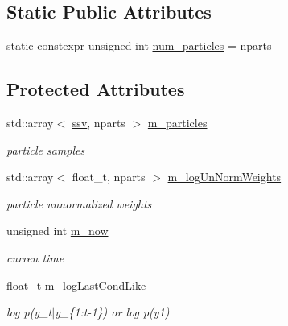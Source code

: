 \subsection*{Static Public Attributes}
\begin{DoxyCompactItemize}
\item 
static constexpr unsigned int \hyperlink{classAPF_a3cc77adc62c7de8ddbdee9240701dc78}{num\+\_\+particles} = nparts
\end{DoxyCompactItemize}
\subsection*{Protected Attributes}
\begin{DoxyCompactItemize}
\item 
\mbox{\label{classAPF_a620b00e90348a8c14efe7945a65b1580}} 
std\+::array$<$ \hyperlink{classAPF_a8b170471292cd6fb5c3c19b55b42fc4e}{ssv}, nparts $>$ \hyperlink{classAPF_a620b00e90348a8c14efe7945a65b1580}{m\+\_\+particles}
\begin{DoxyCompactList}\small\item\em particle samples \end{DoxyCompactList}\item 
\mbox{\label{classAPF_a5b85e6acfa83f9e12e9347e73f5babe8}} 
std\+::array$<$ float\+\_\+t, nparts $>$ \hyperlink{classAPF_a5b85e6acfa83f9e12e9347e73f5babe8}{m\+\_\+log\+Un\+Norm\+Weights}
\begin{DoxyCompactList}\small\item\em particle unnormalized weights \end{DoxyCompactList}\item 
\mbox{\label{classAPF_a11aac4279dd6fad1b58cec14cd99e093}} 
unsigned int \hyperlink{classAPF_a11aac4279dd6fad1b58cec14cd99e093}{m\+\_\+now}
\begin{DoxyCompactList}\small\item\em curren time \end{DoxyCompactList}\item 
\mbox{\label{classAPF_a8086a1d477d911035881a1da7decc235}} 
float\+\_\+t \hyperlink{classAPF_a8086a1d477d911035881a1da7decc235}{m\+\_\+log\+Last\+Cond\+Like}
\begin{DoxyCompactList}\small\item\em log p(y\+\_\+t$\vert$y\+\_\+\{1\+:t-\/1\}) or log p(y1) \end{DoxyCompactList}\item 

\end{DoxyCompactItemize}
